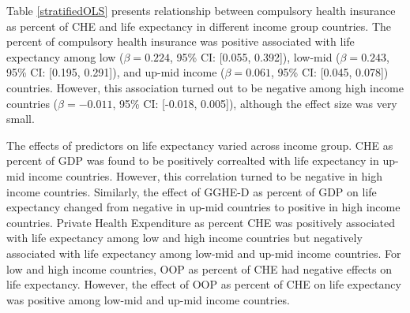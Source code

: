 \documentclass[]{elsarticle} %
\begin{document}
Table \ref{stratifiedOLS} presents relationship between compulsory health insurance as percent of CHE and life expectancy in different income group countries. The percent of compulsory health insurance was positive associated with life expectancy among low (\(\beta = 0.224\), 95\% CI: {[}0.055, 0.392{]}), low-mid (\(\beta = 0.243\), 95\% CI: {[}0.195, 0.291{]}), and up-mid income (\(\beta = 0.061\), 95\% CI: {[}0.045, 0.078{]}) countries. However, this association turned out to be negative among high income countries (\(\beta = -0.011\), 95\% CI: {[}-0.018, 0.005{]}), although the effect size was very small.

The effects of predictors on life expectancy varied across income group. CHE as percent of GDP was found to be positively correalted with life expectancy in up-mid income countries. However, this correlation turned to be negative in high income countries. Similarly, the effect of GGHE-D as percent of GDP on life expectancy changed from negative in up-mid countries to positive in high income countries. Private Health Expenditure as percent CHE was positively associated with life expectancy among low and high income countries but negatively associated with life expectancy among low-mid and up-mid income countries. For low and high income countries, OOP as percent of CHE had negative effects on life expectancy. However, the effect of OOP as percent of CHE on life expectancy was positive among low-mid and up-mid income countries.
\end{document}
